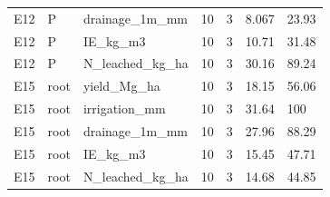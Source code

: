{\begin{longtable}
{}E12 & P & drainage\_1m\_mm & 10 & 3 & 8.067 & 23.93\\
{}E12 & P & IE\_kg\_m3 & 10 & 3 & 10.71 & 31.48\\
{}E12 & P & N\_leached\_kg\_ha & 10 & 3 & 30.16 & 89.24\\
{}E15 & root & yield\_Mg\_ha & 10 & 3 & 18.15 & 56.06\\
{}E15 & root & irrigation\_mm & 10 & 3 & 31.64 & 100\\
{}E15 & root & drainage\_1m\_mm & 10 & 3 & 27.96 & 88.29\\
{}E15 & root & IE\_kg\_m3 & 10 & 3 & 15.45 & 47.71\\
{}E15 & root & N\_leached\_kg\_ha & 10 & 3 & 14.68 & 44.85\\
\bottomrule
\end{longtable}}

